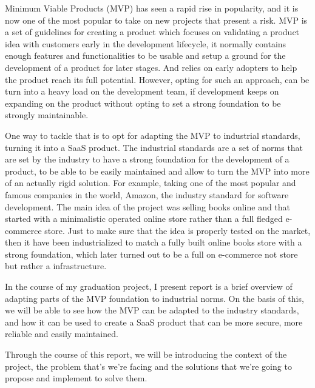 Minimum Viable Products (MVP) has seen a rapid rise in popularity, and it is
now one of the most popular to take on new projects that present a risk.
MVP is a set of guidelines for creating a product which focuses on validating
a product idea with customers early in the development lifecycle, it normally
contains enough features and functionalities to be usable and setup a ground
for the development of a product for later stages. And relies on early adopters
to help the product reach its full potential. However, opting for such an approach,
can be turn into a heavy load on the development team, if development keeps on expanding
on the product without opting to set a strong foundation to be strongly maintainable.

One way to tackle that is to opt for adapting the MVP to industrial standards,
turning it into a SaaS product. The industrial standards are a set of norms that
are set by the industry to have a strong foundation for the development of a
product, to be able to be easily maintained and allow to turn the MVP into more of
an actually rigid solution. For example, taking one of the most popular and famous
companies in the world, Amazon, the industry standard for software development. The main
idea of the project was selling books online and that started with a minimalistic operated
online store rather than a full fledged e-commerce store. Just to make sure that
the idea is properly tested on the market, then it have been industrialized to match
a fully built online books store with a strong foundation, which later turned out to
be a full on e-commerce not store but rather a infrastructure.

In the course of my graduation project, I present report is a brief overview of adapting
parts of the MVP foundation to industrial norms. On the basis of this, we will be able to
see how the MVP can be adapted to the industry standards, and how it can be used to create
a SaaS product that can be more secure, more reliable and easily maintained.

Through the course of this report, we will be introducing the context of the project,
the problem that's we're facing and the solutions that we're going to propose and implement
to solve them.

